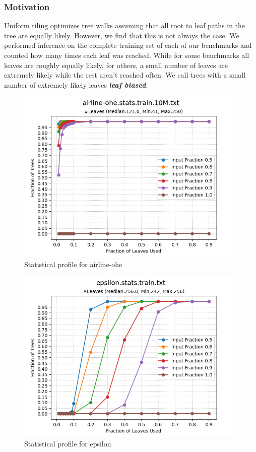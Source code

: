 \subsubsection{Motivation}
Uniform tiling optimizes tree walks assuming that all root to leaf paths in the tree are equally likely. 
However, we find that this is not always the case. We performed inference on the complete training set of each of our benchmarks and counted how many
times each leaf was reached. While for some benchmarks all leaves are roughly equally likely, for others, a small number of leaves are extremely likely 
while the rest aren't reached often. We call trees with a small number of extremely likely leaves \textbf{\emph{leaf biased}}.
\begin{figure}
    \centering
    \includegraphics[width=\linewidth]{figures/airline-ohe.stats.train.txt.png}
    \caption{Statistical profile for airline-ohe}
    \label{Fig:AirlineOHEStats}
\end{figure}
\begin{figure}
    \centering
    \includegraphics[width=\linewidth]{figures/epsilon.stats.train.txt.png}
    \caption{Statistical profile for epsilon}
    \label{Fig:EpsilonStats}
\end{figure}

